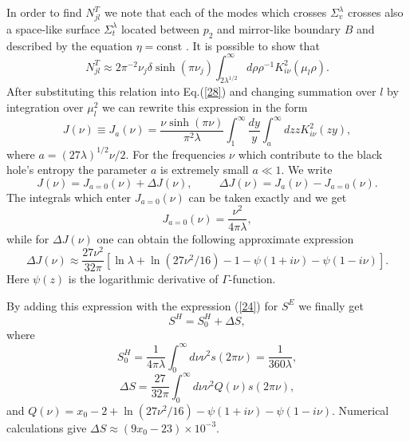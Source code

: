 \documentclass[superscriptaddress,showpacs,preprintnumbers,amsmath,amssymb,
nofootinbib,aps,prd,12pt]{revtex4-1}
\begin{document}
In order  to find  $N_{jl}^T$ we  note that  each of  the modes  which
crosses $\Sigma^{\lambda}_v$ crosses  also a space-like surface
$\Sigma^{\lambda}_t$ located
between  $p_2$  and  mirror-like  boundary  $B$  and  described by the
equation $\eta =$const . It is possible to show that
\begin{equation}
N_{jl}^T \approx 2\pi^{-2} \nu_j \delta \sinh (\pi \nu_j )
\int_{2\lambda ^{1/2}}^{\infty} d\rho \rho^{-1}K_{i\nu }^2 (\mu_l \rho ) .
\label{27}
\end{equation}
After substituting this relation  into Eq.(\ref{28}) and changing  summation
over $l$ by integration over $\mu_l^2$ we can rewrite this  expression
in the form
\begin{equation}
J(\nu ) \equiv J_a (\nu )
=\frac{\nu \sinh (\pi \nu )}{\pi ^2 \lambda }
\int_1^{\infty}\frac{dy}{y}\int_a^{\infty}
dz z K_{i\nu}^2 (zy) ,\label{29}
\end{equation}
where $a=(27\lambda )^{1/2}\nu /2$. For the frequencies $\nu$
which contribute to the black hole's entropy the parameter
$a$ is extremely small $a\ll 1$. We write
\begin{equation}
J(\nu ) =J_{a=0}(\nu )+\Delta J(\nu ),
\hspace{1cm}\Delta J(\nu ) =J_a (\nu )-J_{a=0}(\nu ) . \label{30}
\end{equation}
The integrals which enter $J_{a=0}(\nu )$ can be taken exactly and
we get
\begin{equation}
J_{a=0}(\nu ) =\frac{\nu ^2}{4\pi \lambda}, \label{31}
\end{equation}
while for $\Delta J(\nu )$ one can obtain the following
approximate expression
\begin{equation}
\Delta J(\nu ) \approx \frac{27\nu ^2}{32\pi}[\ln \lambda +
\ln (27\nu ^2 /16)-1 -\psi (1+i\nu )-\psi (1-i\nu )].
\label{32}
\end{equation}
Here $\psi (z)$ is the logarithmic derivative of $\Gamma$-function.

By adding this expression with the expression (\ref{24})
for $S^E$ we finally get
\begin{equation}
S^H =S^H_0 +\Delta S, \label{34}
\end{equation}
where
\begin{equation}
S^H_0 =\frac{1}{4\pi \lambda}\int_0^{\infty}d\nu \nu ^2 s(2\pi \nu )
=\frac{1}{360\lambda}, \label{35}
\end{equation}
\begin{equation}
\Delta S = \frac{27}{32\pi}\int_0^{\infty}d\nu \nu^2 Q(\nu )s(2\pi \nu ) ,
\label{36}
\end{equation}
and $Q(\nu )=x_0 -2 +\ln (27\nu ^2 /16)-\psi (1+i\nu )-\psi (1-i\nu )$.
Numerical calculations give $\Delta S\approx (9x_0 -23)\times
10^{-3}$.
\end{document}
